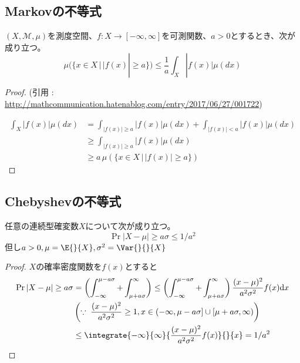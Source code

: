         \subsection{Markovの不等式}
            \begin{shadebox}
                $(X,\mathcal{M},\mu)$を測度空間、$f:X\to[-\infty,\infty]$を可測関数、$a>0$とするとき、次が成り立つ。
                \[\displaystyle \mu(\{x\in X\,|\,|f(x)|\ge a\})\le\frac{1}{a}\int_{X}|f(x)|\mu(dx)\]
            \end{shadebox}
            \begin{proof}
                \quad\par
                (引用 : \url{http://mathcommunication.hatenablog.com/entry/2017/06/27/001722})
                \par
                \begin{equation*}
                    \begin{split}
                        \int_{X}|f(x)|\mu(dx) & =\int_{|f(x)|\ge a} |f(x)|\mu(dx) + \int_{|f(x)|<a}|f(x)|\mu(dx) \\
                        & \ge\int_{|f(x)|\ge a} |f(x)|\mu(dx) \\
                        & \ge a\,\mu(\{x\in X\,|\,|f(x)|\ge a\})
                    \end{split}
                \end{equation*}
            \end{proof}
        \subsection{Chebyshevの不等式}
            \begin{shadebox}
                任意の連続型確変数$X$について次が成り立つ。
                \[ \Pr{|X-\mu|\geq a\sigma} \leq 1/a^2 \]
                但し$a>0, \mu = \E{}{X}, \sigma^2 = \Var{}{}{X}$
            \end{shadebox}
            \begin{proof}
                \quad\par
                $X$の確率密度関数を$f(x)$とすると
                \begin{align*}
                    \Pr{|X-\mu| \geq a\sigma} &= \left(\int_{-\infty}^{\mu-a\sigma} + \int_{\mu+a\sigma}^\infty\right) \leq \left(\int_{-\infty}^{\mu-a\sigma} + \int_{\mu+a\sigma}^\infty\right)\frac{(x-\mu)^2}{a^2\sigma^2}f(x)\mathrm{d}x \\
                    &\left(\because\;\frac{(x-\mu)^2}{a^2\sigma^2} \geq 1, x\in(-\infty,\mu-a\sigma]\cup[\mu+a\sigma,\infty)\right) \\
                    &\leq \integrate{-\infty}{\infty}{\frac{(x-\mu)^2}{a^2\sigma^2}f(x)}{}{x} = 1/a^2
                \end{align*}
            \end{proof}
